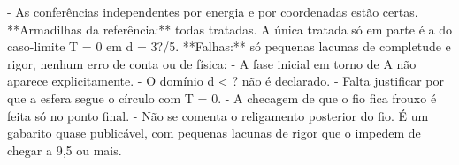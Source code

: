 \documentclass{article}%
\begin{document}
{-} As conferências independentes por energia e por coordenadas estão certas.\newline%
\newline%
**Armadilhas da referência:** todas tratadas. A única tratada só em parte é a do caso{-}limite T = 0 em d = 3?/5.\newline%
\newline%
**Falhas:** só pequenas lacunas de completude e rigor, nenhum erro de conta ou de física:\newline%
{-} A fase inicial em torno de A não aparece explicitamente.\newline%
{-} O domínio d < ? não é declarado.\newline%
{-} Falta justificar por que a esfera segue o círculo com T = 0.\newline%
{-} A checagem de que o fio fica frouxo é feita só no ponto final.\newline%
{-} Não se comenta o religamento posterior do fio.\newline%
\newline%
É um gabarito quase publicável, com pequenas lacunas de rigor que o impedem de chegar a 9,5 ou mais.%
\end{document}
